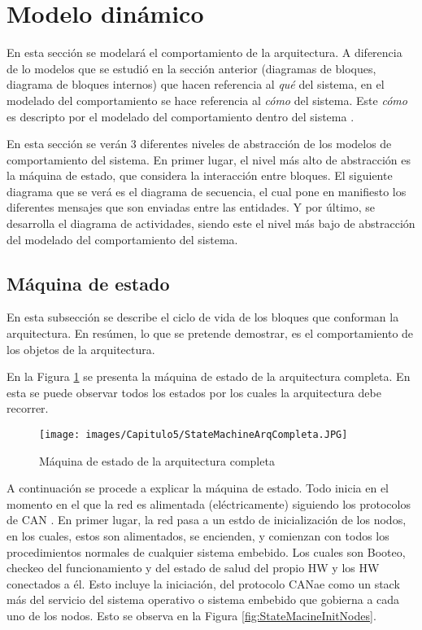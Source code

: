 \section{Modelo dinámico}\label{sec:modelo_dinamico}
En esta sección se modelará el comportamiento de la arquitectura.
A diferencia de lo modelos  que se estudió en la sección anterior (diagramas
de bloques, diagrama de bloques internos) que hacen referencia al
\textit{qué} del sistema, en el modelado del comportamiento se
hace referencia al \textit{cómo} del sistema. Este \textit{cómo}
es descripto por el modelado del comportamiento dentro del
sistema \citep{HoltPery}.

En esta sección se verán  3 diferentes niveles de abstracción
de los modelos de comportamiento del sistema. En primer lugar, el
nivel más alto de abstracción es la máquina de estado, que considera la
interacción entre bloques. El siguiente diagrama que se verá es
el diagrama de secuencia, el cual pone en manifiesto los diferentes
mensajes que son enviadas entre las entidades. Y por último, se
desarrolla el diagrama de actividades, siendo este el nivel
más bajo de abstracción del modelado del comportamiento del sistema.

\subsection{Máquina de estado}
En esta subsección se describe el ciclo de vida de los
bloques que conforman la arquitectura. En resúmen, lo que se
pretende demostrar, es el comportamiento de los objetos de la
arquitectura.

En la Figura \ref{fig:StateMachineArqCompleta} se presenta la
máquina de estado de la arquitectura completa.  En esta se
puede observar todos los estados por los cuales la arquitectura
debe recorrer.

\begin{figure}[h!]
 \centering
 \texttt{[image: images/Capitulo5/StateMachineArqCompleta.JPG]}
  \caption{Máquina de estado de la arquitectura completa}
\label{fig:StateMachineArqCompleta}
\end{figure}

A continuación se procede a explicar la máquina de estado. Todo
inicia en el momento en el que la red es alimentada (eléctricamente)
siguiendo los protocolos de CAN \citep{can-ciaWEB}. En primer lugar, la
red pasa a un estdo de inicialización de los nodos, en los cuales, estos
son alimentados, se encienden, y comienzan con todos los procedimientos
normales de cualquier sistema embebido. Los cuales son Booteo, checkeo del
funcionamiento y del estado de salud del propio \ac{HW} y los \ac{HW}
conectados a él. Esto incluye la iniciación, del protocolo CANae como
un stack más del servicio del sistema operativo o sistema embebido
que gobierna a cada uno de los nodos. Esto se observa en la Figura
\ref{fig:StateMacineInitNodes}.


